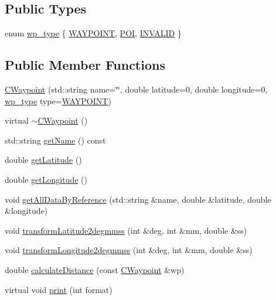 \subsection*{Public Types}
\begin{DoxyCompactItemize}
\item 
enum \hyperlink{classCWaypoint_afc0d93011dc8399f17e05ea26f1abb8a}{wp\+\_\+type} \{ \hyperlink{classCWaypoint_afc0d93011dc8399f17e05ea26f1abb8aa22c9bb710a20488e41e0522f836edcee}{W\+A\+Y\+P\+O\+I\+NT}, 
\hyperlink{classCWaypoint_afc0d93011dc8399f17e05ea26f1abb8aac5313b10832538160cae4612688df59f}{P\+OI}, 
\hyperlink{classCWaypoint_afc0d93011dc8399f17e05ea26f1abb8aaf3998ae68619b810a26451138606a57e}{I\+N\+V\+A\+L\+ID}
 \}
\end{DoxyCompactItemize}
\subsection*{Public Member Functions}
\begin{DoxyCompactItemize}
\item 
\hyperlink{classCWaypoint_addbb5ff027b48242d3e905ccfb7c6453}{C\+Waypoint} (std\+::string name=\char`\"{}\char`\"{}, double latitude=0, double longitude=0, \hyperlink{classCWaypoint_afc0d93011dc8399f17e05ea26f1abb8a}{wp\+\_\+type} type=\hyperlink{classCWaypoint_afc0d93011dc8399f17e05ea26f1abb8aa22c9bb710a20488e41e0522f836edcee}{W\+A\+Y\+P\+O\+I\+NT})
\item 
virtual \hyperlink{classCWaypoint_a74c7197b95df5dc4e631935d33c5ad27}{$\sim$\+C\+Waypoint} ()
\item 
std\+::string \hyperlink{classCWaypoint_afa0887a7523a345624046168fe3a2ce5}{get\+Name} () const
\item 
double \hyperlink{classCWaypoint_a8040d28d7b4628799f61565ba53e55b0}{get\+Latitude} ()
\item 
double \hyperlink{classCWaypoint_a662b4705b3f60929856ebacdebf8bf2d}{get\+Longitude} ()
\item 
void \hyperlink{classCWaypoint_a352acef38557203e1e266528e2aa23cf}{get\+All\+Data\+By\+Reference} (std\+::string \&name, double \&latitude, double \&longitude)
\item 
void \hyperlink{classCWaypoint_aec530aa8f453abd22cf41d8a6c6080f2}{transform\+Latitude2degmmss} (int \&deg, int \&mm, double \&ss)
\item 
void \hyperlink{classCWaypoint_aba26f2ba294cf5bb5bd0be1d9fdb1214}{transform\+Longitude2degmmss} (int \&deg, int \&mm, double \&ss)
\item 
double \hyperlink{classCWaypoint_aff44ab2fb23c9b96646550392644dd8a}{calculate\+Distance} (const \hyperlink{classCWaypoint}{C\+Waypoint} \&wp)
\item 
virtual void \hyperlink{classCWaypoint_a9a4177a2734842c9395658cb60a70c24}{print} (int format)
\end{DoxyCompactItemize}
